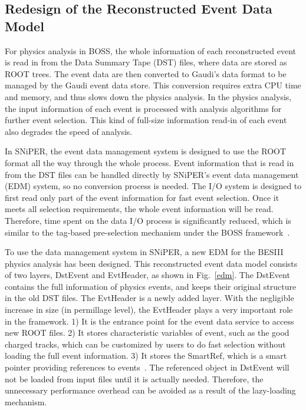\documentclass[a4paper,10pt,twoside]{cpc-hepnp}
\begin{document}
\begin{CJK*}{GB}{gbsn}
\begin{multicols}{2}
\section{Redesign of the Reconstructed Event Data Model}

For physics analysis in BOSS, the whole information of each reconstructed event is read in from the Data Summary Tape (DST) files, where data are stored as ROOT trees.
The event data are then converted to Gaudi's data format to be managed by the Gaudi event data store.
This conversion requires extra CPU time and memory, and thus slows down the physics analysis.
In the physics analysis, the input information of each event is processed with analysis algorithms for further event selection.
This kind of full-size information read-in of each event also degrades the speed of analysis.

In SNiPER, the event data management system is designed to use the ROOT format all the way through the whole process.
Event information that is read in from the DST files can be handled directly by  SNiPER's event data management (EDM) system, so no conversion process is needed.
The I/O system is designed to first read only part of the event information for fast event selection. 
Once it meets all selection requirements, the whole event information will be read. 
Therefore, time spent on the data I/O process is significantly reduced, which is similar to the tag-based pre-selection mechanism under the BOSS framework~\cite{tag_boss}.

To use the data management system in SNiPER, a new EDM for the BESIII physics analysis has been designed.
This reconstructed event data model consists of two layers, DstEvent and EvtHeader, as shown in Fig.~\ref{edm}.
The DstEvent contains the full information of physics events, and keeps their original structure in the old DST files.
The EvtHeader is a newly added layer.
With the negligible increase in size (in permillage level), the EvtHeader plays a very important role in the framework.
1) It is the entrance point for the event data service to access new ROOT files.
2) It stores characteristic variables of event, such as the good charged tracks, which can be customized by users to do fast selection without loading the full event information.
3) It stores the SmartRef, which is a smart pointer providing references to events~\cite{smartref}.
The referenced object in DstEvent will not be loaded from input files until it is actually needed.
Therefore, the unnecessary performance overhead can be avoided as a result of the lazy-loading mechanism.


\end{multicols}
\end{CJK*}
\end{document}
